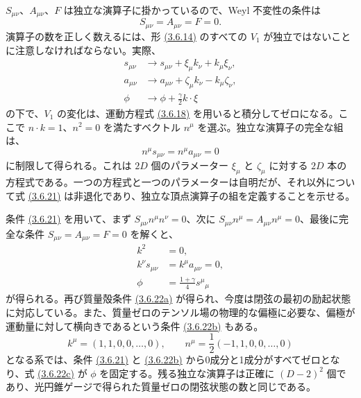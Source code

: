 $S_{\mu\nu}$、$A_{\mu\nu}$、$F$ は独立な演算子に掛かっているので、Weyl 不変性の条件は
\begin{equation}
S_{\mu\nu}=A_{\mu\nu}=F=0.
\tag{3.6.19}\label{eq:3.6.19}
\end{equation}
演算子の数を正しく数えるには、形 \hyperref[eq:3.6.14]{(3.6.14)} のすべての $V_1$ が独立ではないことに注意しなければならない。実際、
\begin{align}
s_{\mu\nu}&\longrightarrow s_{\mu\nu}+\xi_\mu k_\nu+k_\mu\xi_\nu,
\tag{3.6.20a}\label{eq:3.6.20a}\\
a_{\mu\nu}&\longrightarrow a_{\mu\nu}+\zeta_\mu k_\nu-k_\mu\zeta_\nu,
\tag{3.6.20b}\label{eq:3.6.20b}\\
\phi&\longrightarrow\phi+\frac{\gamma}{2}k\cdot\xi
\tag{3.6.20c}\label{eq:3.6.20c}
\end{align}
の下で、$V_1$ の変化は、運動方程式 \hyperref[eq:3.6.18]{(3.6.18)} を用いると積分してゼロになる。ここで $n\cdot k=1$、$n^2=0$ を満たすベクトル $n^\mu$ を選ぶ。独立な演算子の完全な組は、
\begin{equation}
n^\mu s_{\mu\nu}=n^\mu a_{\mu\nu}=0
\tag{3.6.21}\label{eq:3.6.21}
\end{equation}
に制限して得られる。これは $2D$ 個のパラメーター $\xi_\mu$ と $\zeta_\mu$ に対する $2D$ 本の方程式である。一つの方程式と一つのパラメーターは自明だが、それ以外について式 \hyperref[eq:3.6.21]{(3.6.21)} は非退化であり、独立な頂点演算子の組を定義することを示せる。

条件 \hyperref[eq:3.6.21]{(3.6.21)} を用いて、まず $S_{\mu\nu}n^\mu n^\nu=0$、次に $S_{\mu\nu}n^\mu=A_{\mu\nu}n^\mu=0$、最後に完全な条件 $S_{\mu\nu}=A_{\mu\nu}=F=0$ を解くと、
\begin{align}
k^2&=0,
\tag{3.6.22a}\label{eq:3.6.22a}\\
k^\nu s_{\mu\nu}&=k^\mu a_{\mu\nu}=0,
\tag{3.6.22b}\label{eq:3.6.22b}\\
\phi&=\frac{1+\gamma}{4}s^\mu{}_\mu
\tag{3.6.22c}\label{eq:3.6.22c}
\end{align}
が得られる。再び質量殻条件 \hyperref[eq:3.6.22a]{(3.6.22a)} が得られ、今度は閉弦の最初の励起状態に対応している。また、質量ゼロのテンソル場の物理的な偏極に必要な、偏極が運動量に対して横向きであるという条件 \hyperref[eq:3.6.22b]{(3.6.22b)} もある。
\begin{equation}
k^\mu=(1,1,0,0,\ldots,0),\qquad
n^\mu=\frac12(-1,1,0,0,\ldots,0)
\tag{3.6.23}\label{eq:3.6.23}
\end{equation}
となる系では、条件 \hyperref[eq:3.6.21]{(3.6.21)} と \hyperref[eq:3.6.22b]{(3.6.22b)} から0成分と1成分がすべてゼロとなり、式 \hyperref[eq:3.6.22c]{(3.6.22c)} が $\phi$ を固定する。残る独立な演算子は正確に $(D-2)^2$ 個であり、光円錐ゲージで得られた質量ゼロの閉弦状態の数と同じである。

